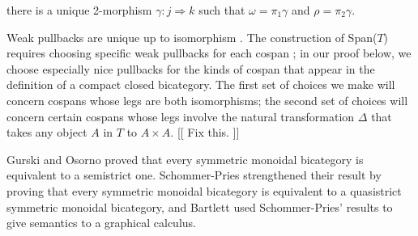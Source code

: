 \documentclass[12pt,twoside,openright]{report}
\newcommand{\maps}{\colon}
\begin{document}
\begin{center}
\end{center}
there is a unique 2-morphism $\gamma\maps j \Rightarrow k$ such that $\omega = \pi_1\gamma$ and $\rho = \pi_2\gamma.$

Weak pullbacks are unique up to isomorphism \cite{nlab2pullbacks}.  The construction of Span($T$) requires choosing specific weak pullbacks for each cospan \cite[3.2.1]{Hoffnung}; in our proof below, we choose especially nice pullbacks for the kinds of cospan that appear in the definition of a compact closed bicategory.  The first set of choices we make will concern cospans whose legs are both isomorphisms; the second set of choices will concern certain cospans whose legs involve the natural transformation $\Delta$ that takes any object $A$ in $T$ to $A \times A.$  [[ Fix this. ]]

Gurski and Osorno \cite{GO} proved that every symmetric monoidal bicategory is equivalent to a semistrict one.  Schommer-Pries \cite{SPT} strengthened their result by proving that every symmetric monoidal bicategory is equivalent to a quasistrict symmetric monoidal bicategory, and Bartlett \cite{Bartlett} used Schommer-Pries' results to give semantics to a graphical calculus.
\end{document}

